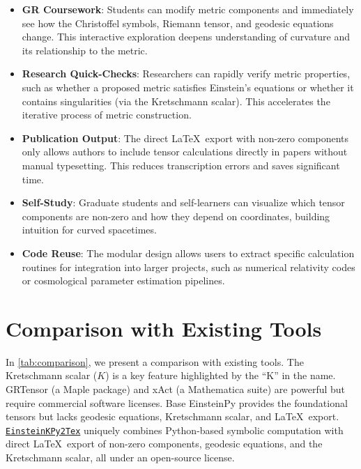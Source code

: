 \documentclass[11pt,a4paper]{article}
\begin{document}
\begin{itemize}
    \item \textbf{GR Coursework}: Students can modify metric components and immediately see how the Christoffel symbols, Riemann tensor, and geodesic equations change. This interactive exploration deepens understanding of curvature and its relationship to the metric.

    \item \textbf{Research Quick-Checks}: Researchers can rapidly verify metric properties, such as whether a proposed metric satisfies Einstein's equations or whether it contains singularities (via the Kretschmann scalar). This accelerates the iterative process of metric construction.

    \item \textbf{Publication Output}: The direct \LaTeX\ export with non-zero components only allows authors to include tensor calculations directly in papers without manual typesetting. This reduces transcription errors and saves significant time.

    \item \textbf{Self-Study}: Graduate students and self-learners can visualize which tensor components are non-zero and how they depend on coordinates, building intuition for curved spacetimes.

    \item \textbf{Code Reuse}: The modular design allows users to extract specific calculation routines for integration into larger projects, such as numerical relativity codes or cosmological parameter estimation pipelines.
\end{itemize}

\section{Comparison with Existing Tools}

In \autoref{tab:comparison}, we present a comparison with existing tools. The Kretschmann scalar ($K$) is a key feature highlighted by the ``K'' in the name. GRTensor (a Maple package) and xAct (a Mathematica suite) are powerful but require commercial software licenses. Base EinsteinPy provides the foundational tensors but lacks geodesic equations, Kretschmann scalar, and \LaTeX\ export. \href{https://github.com/lontelis/Einsteinpy_to_latex}{{\color{cyan}\texttt{EinsteinKPy2Tex}}} uniquely combines Python-based symbolic computation with direct \LaTeX\ export of non-zero components, geodesic equations, and the Kretschmann scalar, all under an open-source license.
\end{document}

